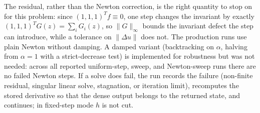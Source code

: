 The residual, rather than the Newton correction, is the right quantity to stop on for this problem: since $(1,1,1)^Tf\equiv0$, one step changes the invariant by exactly $(1,1,1)^TG(z)=\sum_iG_i(z)$, so $\|G\|_\infty$ bounds the invariant defect the step can introduce, while a tolerance on $\|\Delta u\|$ does not. The production runs use plain Newton without damping. A damped variant (backtracking on $\alpha$, halving from $\alpha=1$ with a strict-decrease test) is implemented for robustness but was not needed: across all reported uniform-step, sweep, and Newton-sweep runs there are no failed Newton steps. If a solve does fail, the run records the failure (non-finite residual, singular linear solve, stagnation, or iteration limit), recomputes the stored derivative so that the dense output belongs to the returned state, and continues; in fixed-step mode $h$ is not cut.

